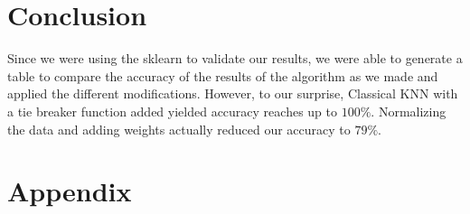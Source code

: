 \documentclass{article}
\begin{document}
\section{Conclusion}
Since we were using the sklearn to validate our results, we were able to generate a table to compare the accuracy of the results of the algorithm as we made and applied the different modifications. However, to our surprise, Classical KNN with a tie breaker function added yielded accuracy reaches up to $100\%$. Normalizing the data and adding weights actually reduced our accuracy to $79\%$. 
 
 
 \section{Appendix}


  
 
\end{document}

